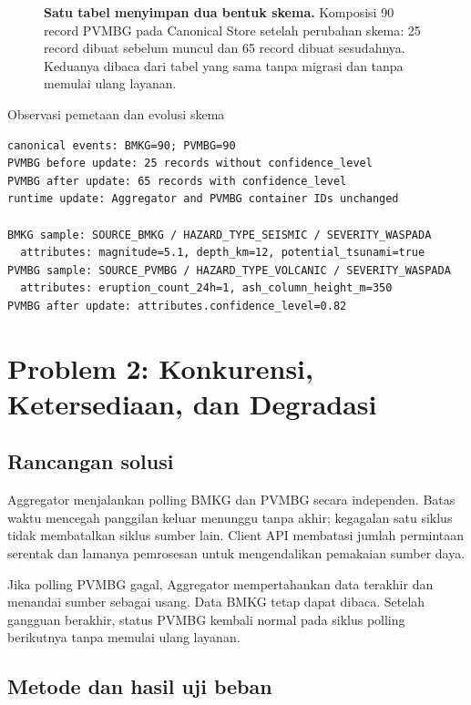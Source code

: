 \documentclass{fairmeta}
\newcommand{\code}[1]{\texttt{\detokenize{#1}}}
\begin{document}
\begin{figure}[htbp]
\centering

\caption[Komposisi record PVMBG sebelum dan sesudah perubahan skema]{\textbf{Satu tabel menyimpan dua bentuk skema.} Komposisi 90 record PVMBG pada Canonical Store setelah perubahan skema: 25 record dibuat sebelum \code{confidence_level} muncul dan 65 record dibuat sesudahnya. Keduanya dibaca dari tabel yang sama tanpa migrasi dan tanpa memulai ulang layanan.}
\label{fig:p1-schema}
\end{figure}

\begin{evidencebox}{Observasi pemetaan dan evolusi skema}
\begin{lstlisting}
canonical events: BMKG=90; PVMBG=90
PVMBG before update: 25 records without confidence_level
PVMBG after update: 65 records with confidence_level
runtime update: Aggregator and PVMBG container IDs unchanged

BMKG sample: SOURCE_BMKG / HAZARD_TYPE_SEISMIC / SEVERITY_WASPADA
  attributes: magnitude=5.1, depth_km=12, potential_tsunami=true
PVMBG sample: SOURCE_PVMBG / HAZARD_TYPE_VOLCANIC / SEVERITY_WASPADA
  attributes: eruption_count_24h=1, ash_column_height_m=350
PVMBG after update: attributes.confidence_level=0.82
\end{lstlisting}
\end{evidencebox}

\section{Problem 2: Konkurensi, Ketersediaan, dan Degradasi}

\subsection{Rancangan solusi}

Aggregator menjalankan polling BMKG dan PVMBG secara independen. Batas waktu mencegah panggilan keluar menunggu tanpa akhir; kegagalan satu siklus tidak membatalkan siklus sumber lain. Client API membatasi jumlah permintaan serentak dan lamanya pemrosesan untuk mengendalikan pemakaian sumber daya.

Jika polling PVMBG gagal, Aggregator mempertahankan data terakhir dan menandai sumber sebagai usang. Data BMKG tetap dapat dibaca. Setelah gangguan berakhir, status PVMBG kembali normal pada siklus polling berikutnya tanpa memulai ulang layanan.

\subsection{Metode dan hasil uji beban}
\end{document}
